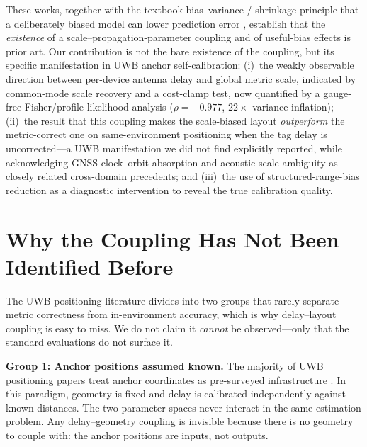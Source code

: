 \documentclass[11pt,a4paper]{article}
\begin{document}
These works, together with the textbook bias--variance / shrinkage principle that a
deliberately biased model can lower prediction error
\citep{hastie_2009_elements_statistical_learning}, establish that the \emph{existence}
of a scale--propagation-parameter coupling and of useful-bias effects is prior art.
Our contribution is not the bare existence of the coupling, but its specific
manifestation in UWB anchor self-calibration: (i)~the weakly observable direction
between per-device antenna delay and global metric scale, indicated by common-mode
scale recovery and a cost-clamp test, now quantified by a gauge-free Fisher/profile-likelihood analysis ($\rho=-0.977$, $22\times$ variance inflation);
(ii)~the result that this coupling makes the scale-biased layout
\emph{outperform} the metric-correct one on same-environment positioning when the tag
delay is uncorrected---a UWB manifestation we did not find explicitly reported, while
acknowledging GNSS clock--orbit absorption \citep{pan_2015_realtime_ppp_clock_orbit}
and acoustic scale ambiguity \citep{burgess_2015_toa_self_calibration} as closely
related cross-domain precedents; and (iii)~the use of structured-range-bias reduction
as a diagnostic intervention to reveal the true calibration quality.

\section{Why the Coupling Has Not Been Identified Before}

The UWB positioning literature divides into two groups that rarely separate metric
correctness from in-environment accuracy, which is why delay--layout coupling is easy
to miss. We do not claim it \emph{cannot} be observed---only that the standard
evaluations do not surface it.

\textbf{Group 1: Anchor positions assumed known.} The majority of UWB positioning
papers treat anchor coordinates as pre-surveyed infrastructure
\citep{prorok_2013_models_algorithms_uwb_localization_thesis,wymeersch_2012_a_machine_learning_approach,kong_2023_nlos_identification_for_uwb,sung_2023_accurate_indoor_positioning_for}.
In this paradigm, geometry is fixed and delay is calibrated independently against
known distances. The two parameter spaces never interact in the same estimation
problem. Any delay--geometry coupling is invisible because there is no geometry to
couple with: the anchor positions are inputs, not outputs.
\end{document}

